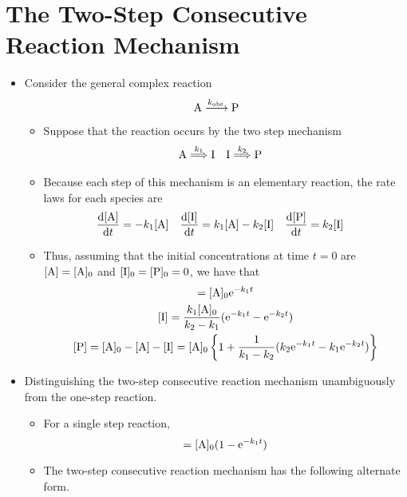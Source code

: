 \documentclass[../notes.tex]{subfiles}
\begin{document}
\section{The Two-Step Consecutive Reaction Mechanism}
\begin{itemize}
    \item {}Consider the general complex reaction
    \begin{equation*}
        \ce{A ->[$k_\text{obs}$] P}
    \end{equation*}
    \begin{itemize}
        \item Suppose that the reaction occurs by the two step mechanism
        \begin{align*}
            \ce{A} &\stackrel{k_1}{\Longrightarrow} \ce{I}&
            \ce{I} &\stackrel{k_2}{\Longrightarrow} \ce{P}
        \end{align*}
        \item Because each step of this mechanism is an elementary reaction, the rate laws for each species are
        \begin{align*}
            \dv{[\ce{A}]}{t} &= -k_1[\ce{A}]&
            \dv{[\ce{I}]}{t} &= k_1[\ce{A}]-k_2[\ce{I}]&
            \dv{[\ce{P}]}{t} &= k_2[\ce{I}]
        \end{align*}
        \item Thus, assuming that the initial concentrations at time $t=0$ are $[\ce{A}]=[\ce{A}]_0$ and $[\ce{I}]_0=[\ce{P}]_0=0$, we have that
        \begin{gather*}
            [\ce{A}] = [\ce{A}]_0\e[-k_1t]\\
            [\ce{I}] = \frac{k_1[\ce{A}]_0}{k_2-k_1}(\e[-k_1t]-\e[-k_2t])\\
            [\ce{P}] = [\ce{A}]_0-[\ce{A}]-[\ce{I}]
                = [\ce{A}]_0\left\{ 1+\frac{1}{k_1-k_2}(k_2\e[-k_1t]-k_1\e[-k_2t]) \right\}
        \end{gather*}
    \end{itemize}
    \item Distinguishing the two-step consecutive reaction mechanism unambiguously from the one-step reaction.
    \begin{itemize}
        \item For a single step reaction,
        \begin{equation*}
            [\ce{P}] = [\ce{A}]_0(1-\e[-k_1t])
        \end{equation*}
        \item The two-step consecutive reaction mechanism has the following alternate form.

\end{itemize}
\end{itemize}
\end{document}
